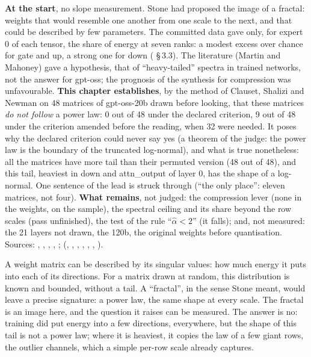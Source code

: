 \begin{origine}
\textbf{At the start}, no slope measurement. Stone had proposed the image of a fractal: weights that would resemble one another from one scale to the next, and that could be described by few parameters. The committed data gave only, for expert 0 of each tensor, the share of energy at seven ranks: a modest excess over chance for gate and up, a strong one for down ( §\,3.3). The literature (Martin and Mahoney) gave a hypothesis, that of ``heavy-tailed'' spectra in trained networks, not the answer for gpt-oss; the prognosis of the synthesis for compression was unfavourable.
\textbf{This chapter establishes}, by the method of Clauset, Shalizi and Newman on 48 matrices of gpt-oss-20b drawn before looking, that these matrices \emph{do not follow} a power law: 0 out of 48 under the declared criterion, 9 out of 48 under the criterion amended before the reading, when 32 were needed. It poses why the declared criterion could never say yes (a theorem of the judge: the power law is the boundary of the truncated log-normal), and what is true nonetheless: all the matrices have more tail than their permuted version (48 out of 48), and this tail, heaviest in down and attn\_output of layer 0, has the shape of a log-normal. One sentence of the lead is struck through (``the only place'': eleven matrices, not four).
\textbf{What remains}, not judged: the compression lever (none in the weights, on the sample), the spectral ceiling and its share beyond the row scales (pass unfinished), the test of the rule ``$\hat\alpha < 2$'' (it falls); and, not measured: the 21 layers not drawn, the 120b, the original weights before quantisation.
Sources: , , , , ;  (, , , , , , ).
\end{origine}

\begin{enbref}
A weight matrix can be described by its singular values: how much energy it puts into each of its directions. For a matrix drawn at random, this distribution is known and bounded, without a tail. A ``fractal'', in the sense Stone meant, would leave a precise signature: a power law, the same shape at every scale. The fractal is an image here, and the question it raises can be measured. The answer is no: training did put energy into a few directions, everywhere, but the shape of this tail is not a power law; where it is heaviest, it copies the law of a few giant rows, the outlier channels, which a simple per-row scale already captures.
\end{enbref}

